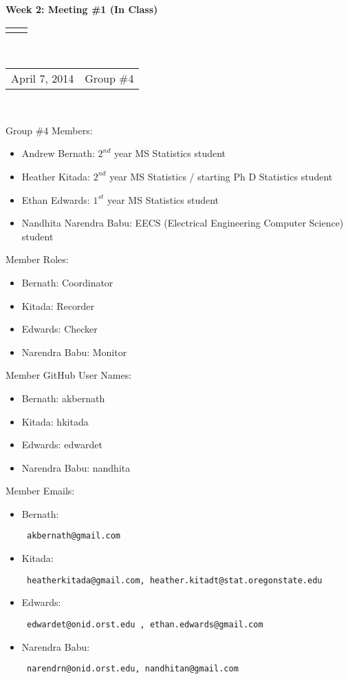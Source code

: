\documentclass[12pt]{article}
\renewcommand{\title}[1]{\textbf{#1}\\}
\renewcommand{\line}{\begin{tabularx}{\textwidth}{X>{\raggedleft}X}\hline\\\end{tabularx}\\[-0.5cm]}
\newcommand{\leftright}[2]{\begin{tabularx}{\textwidth}{X>{\raggedleft}X}#1%
& #2\\\end{tabularx}\\[-0.5cm]}
\begin{document}
\title{Week 2: Meeting \#1 (In Class)}
\line
\leftright{April 7, 2014}{Group \#4} %
\vspace{5mm}

Group \#4 Members: 
\begin{itemize}
\item Andrew Bernath: $2^{nd}$ year MS Statistics student
\item Heather Kitada: $2^{nd}$ year MS Statistics / starting Ph D Statistics student
\item Ethan Edwards: $1^{st}$ year MS Statistics student
\item Nandhita Narendra Babu: EECS (Electrical Engineering Computer Science) student
\end{itemize}

Member Roles: 
\begin{itemize}
\item Bernath: Coordinator 
\item Kitada: Recorder
\item Edwards: Checker
\item Narendra Babu: Monitor 
\end{itemize}

Member GitHub User Names:  
\begin{itemize}
\item Bernath: akbernath
\item Kitada: hkitada
\item Edwards: edwardet
\item Narendra Babu: nandhita
\end{itemize}

Member Emails: 
\begin{itemize}
\item Bernath: \begin{verbatim} akbernath@gmail.com \end{verbatim}
\item Kitada: \begin{verbatim} heatherkitada@gmail.com, heather.kitadt@stat.oregonstate.edu \end{verbatim}
\item Edwards: \begin{verbatim} edwardet@onid.orst.edu , ethan.edwards@gmail.com\end{verbatim}
\item Narendra Babu: \begin{verbatim} narendrn@onid.orst.edu, nandhitan@gmail.com \end{verbatim}
\end{itemize}
\end{document}
